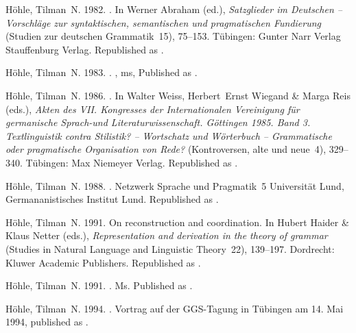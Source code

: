 \begin{thebibliography}{1420}
H{\"o}hle, Tilman~N. 1982.
.
\newblock In Werner Abraham (ed.), \emph{{Satzglieder im Deutschen --
  Vorschl{\"a}ge zur syntaktischen, semantischen und pragmatischen Fundierung}}
  (Studien zur deutschen Grammatik~15), 75--153. T{\"u}bingen: \original Gunter
  Narr Verlag \jetzt Stauffenburg Verlag.
\newblock Republished as .

H{\"o}hle, Tilman~N. 1983.
.
, ms, Published as .

H{\"o}hle, Tilman~N. 1986.
.
\newblock In Walter Weiss, Herbert~Ernst Wiegand \& Marga Reis (eds.),
  \emph{{Akten des VII. Kongresses der Internationalen Vereinigung f{\"u}r
  germanische Sprach-und Literaturwissenschaft. G{\"o}ttingen 1985. Band 3.
  Textlinguistik contra Stilistik? -- Wortschatz und W{\"o}rterbuch --
  Grammatische oder pragmatische Organisation von Rede?}} (Kontroversen, alte
  und neue~4), 329--340. T{\"u}bingen: Max Niemeyer Verlag.
\newblock Republished as .

H{\"o}hle, Tilman~N. 1988.
.
\newblock Netzwerk Sprache und Pragmatik~5 Universit{\"a}t Lund,
  Germananistisches Institut Lund.
\newblock Republished as .

H{\"o}hle, Tilman~N. 1991{}.
\newblock On reconstruction and coordination.
\newblock In Hubert Haider \& Klaus Netter (eds.), \emph{Representation and
  derivation in the theory of grammar} (Studies in Natural Language and
  Linguistic Theory~22), 139--197. Dordrecht: Kluwer Academic Publishers.
\newblock Republished as .

H{\"o}hle, Tilman~N. 1991{}.
.
\newblock Ms. Published as .

H{\"o}hle, Tilman~N. 1994.
.
\newblock Vortrag auf der GGS-Tagung in T{\"u}bingen am 14. Mai 1994, published
  as .


\end{thebibliography}
